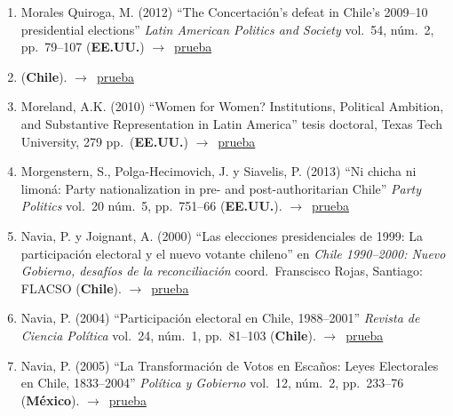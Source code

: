 \documentclass[12 pt, letter]{article}
\newenvironment{CitasMiTrabajo}{
    \begin{footnotesize}
    \begin{enumerate}[label={\footnotesize\emph{cita~\arabic*}},ref=\arabic*] %
        \setlength{\itemsep}{.1\itemsep}
        \setlength{\parskip}{.1\parskip}
    }{\end{enumerate}\end{footnotesize}}
\begin{document}
\begin{CitasMiTrabajo}
        \item Morales Quiroga, M. (2012) 
        ``The Concertaci\'on's defeat in Chile's 2009--10 presidential elections''
        \emph{Latin American Politics and Society} vol.\ 54, n\'um.\ 2, pp.\ 79--107 (\textbf{EE.UU.}) $\rightarrow$~\href{https://github.com/emagar/cv/blob/master/citasMiTrab/mrs/morales2012.pdf}{prueba}

        \item {} (\textbf{Chile}). $\rightarrow$~\href{http://educadi.uct.cl/index.php/RDCP/article/view/1216}{prueba}
        
        \item Moreland, A.K. (2010)
        ``Women for Women? Institutions, Political Ambition, and Substantive Representation in Latin America'' tesis doctoral, Texas Tech University, 279 pp.\ (\textbf{EE.UU.}) $\rightarrow$~\href{https://github.com/emagar/cv/blob/master/citasMiTrab/mrs/MORELAND-DISSERTATION2010.excerpt.pdf}{prueba}

        \item Morgenstern, S., Polga-Hecimovich, J. y Siavelis, P. (2013)
        ``Ni chicha ni limon\'a: Party nationalization in pre- and post-authoritarian Chile''
        \emph{Party Politics} vol.\ 20 n\'um.\ 5, pp.\ 751--66 (\textbf{EE.UU.}). $\rightarrow$~\href{https://github.com/emagar/cv/blob/master/citasMiTrab/mrs/morgenstern.polga.siavelisPtyNatChile2014pp.pdf}{prueba}

        \item Navia, P. y Joignant, A. (2000)
        ``Las elecciones presidenciales de 1999:
        La participaci\'on electoral y el nuevo votante chileno'' en \emph{Chile 1990--2000:
        Nuevo Gobierno, desaf\'ios de la reconciliaci\'on} coord.\ Franscisco Rojas,
        Santiago: FLACSO (\textbf{Chile}). $\rightarrow$~\href{https://github.com/emagar/cv/blob/master/citasMiTrab/mrs/naviaJoignantFlacso.pdf}{prueba}

        \item Navia, P. (2004)
        ``Participaci\'on electoral en Chile, 1988--2001''
        \emph{Revista de Ciencia Pol\'itica} vol.\ 24, n\'um.\ 1, pp.\ 81--103 (\textbf{Chile}). $\rightarrow$~\href{https://github.com/emagar/cv/blob/master/citasMiTrab/mrs/navia2004rcp.pdf}{prueba}

        \item Navia, P. (2005)
        ``La Transformaci\'on de Votos en Esca\~nos: Leyes Electorales en Chile, 1833--2004''
        \emph{Pol\'itica y Gobierno} vol.\ 12, n\'um.\ 2, pp.\ 233--76  (\textbf{M\'exico}). $\rightarrow$~\href{https://github.com/emagar/cv/blob/master/citasMiTrab/mrs/navia2005pyg.pdf}{prueba}


\end{CitasMiTrabajo}
\end{document}
